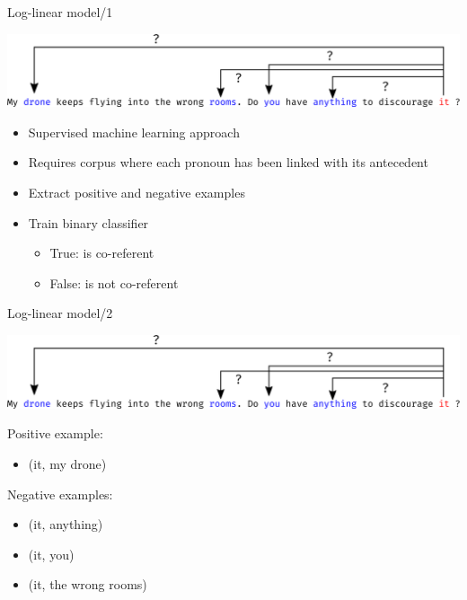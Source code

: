 \documentclass[dvipsnames, 10pt, compress]{beamer}
\begin{document}
\begin{frame}{Log-linear model/1} %

\includegraphics[width=\textwidth]{graphics/classifier-coref-2.eps}

\begin{itemize}
  \item Supervised machine learning approach
  \item Requires corpus where each pronoun has been linked with its antecedent
\end{itemize}

\begin{itemize}
  \item Extract positive and negative examples
  \item Train binary classifier 
  \begin{itemize}
     \item True: is co-referent
     \item False: is not co-referent
  \end{itemize}
\end{itemize}

\end{frame}

\begin{frame}{Log-linear model/2} %

\includegraphics[width=\textwidth]{graphics/classifier-coref-2.eps}

Positive example:
\begin{itemize}
 \item (it, my drone)
\end{itemize}

Negative examples:
\begin{itemize}
 \item (it, anything)
 \item (it, you)
 \item (it, the wrong rooms)
\end{itemize}

\end{frame}
\end{document}
